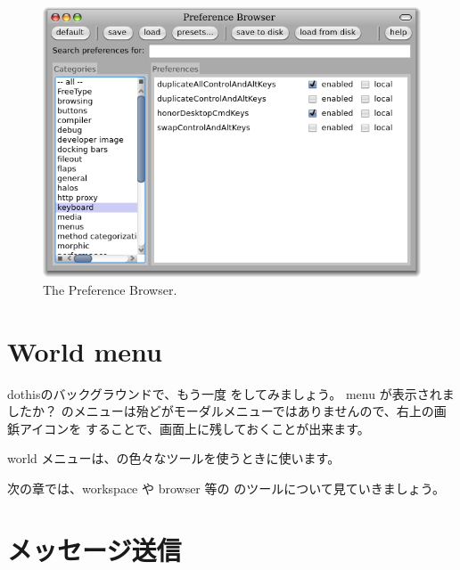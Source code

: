 \documentclass[a4paper,10pt,twoside]{book}
\begin{document}
\begin{figure}[htb]
\centerline{\includegraphics[width=\textwidth]{PreferenceBrowser}}
\caption{The Preference Browser.}
\end{figure}


\section{World menu}

dothis{\pharo のバックグラウンドで、もう一度 \click をしてみましょう。}
 menu が表示されましたか？
\pharo のメニューは殆どがモーダルメニューではありませんので、右上の画鋲アイコンを \click することで、画面上に残しておくことが出来ます。

world メニューは、\pharo の色々なツールを使うときに使います。


次の章では、workspace や browser 等の \pharo のツールについて見ていきましょう。

\section{メッセージ送信}
\end{document}

